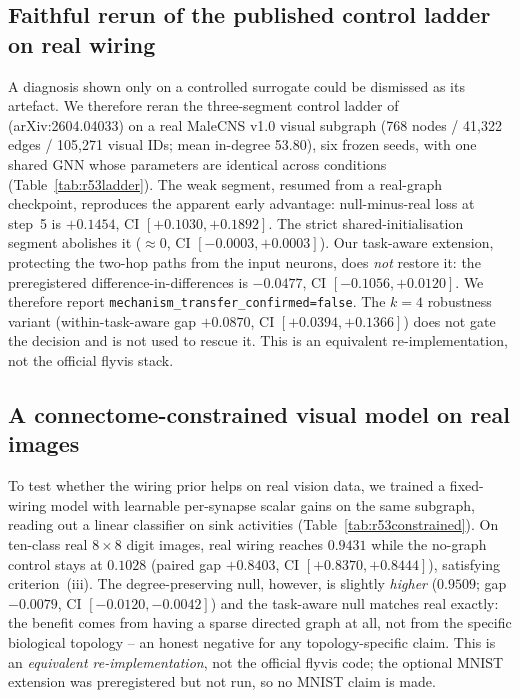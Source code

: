 \documentclass[10pt,twocolumn,letterpaper]{article}
\begin{document}
\subsection{Faithful rerun of the published control ladder on real wiring}
\label{sec:ladderrerun}

A diagnosis shown only on a controlled surrogate could be dismissed as its
artefact. We therefore reran the three-segment control ladder
of~\cite{toposens2026} (arXiv:2604.04033) on a real MaleCNS v1.0 visual
subgraph (768 nodes / 41{,}322 edges / 105{,}271 visual IDs; mean in-degree
53.80), six frozen seeds, with one shared GNN whose parameters are identical
across conditions (Table~\ref{tab:r53ladder}). The weak segment, resumed from a
real-graph checkpoint, reproduces the apparent early advantage: null-minus-real
loss at step~5 is $+0.1454$, CI $[+0.1030,+0.1892]$. The strict
shared-initialisation segment abolishes it ($\approx 0$, CI
$[-0.0003,+0.0003]$). Our task-aware extension, protecting the two-hop paths
from the input neurons, does \emph{not} restore it: the preregistered
difference-in-differences is $-0.0477$, CI $[-0.1056,+0.0120]$. We therefore
report \texttt{mechanism\_transfer\_confirmed=false}. The $k{=}4$ robustness
variant (within-task-aware gap $+0.0870$, CI $[+0.0394,+0.1366]$) does not
gate the decision and is not used to rescue it. This is an equivalent
re-implementation, not the official flyvis stack.

\subsection{A connectome-constrained visual model on real images}
\label{sec:constrained}

To test whether the wiring prior helps on real vision data, we trained a
fixed-wiring model with learnable per-synapse scalar gains on the same
subgraph, reading out a linear classifier on sink activities
(Table~\ref{tab:r53constrained}). On ten-class real $8\times8$ digit images,
real wiring reaches $0.9431$ while the no-graph control stays at $0.1028$
(paired gap $+0.8403$, CI $[+0.8370,+0.8444]$), satisfying criterion~(iii).
The degree-preserving null, however, is slightly \emph{higher} ($0.9509$;
gap $-0.0079$, CI $[-0.0120,-0.0042]$) and the task-aware null matches real
exactly: the benefit comes from having a sparse directed graph at all, not
from the specific biological topology -- an honest negative for any
topology-specific claim. This is an \emph{equivalent re-implementation}, not
the official flyvis code; the optional MNIST extension was preregistered but
not run, so no MNIST claim is made.
\end{document}

